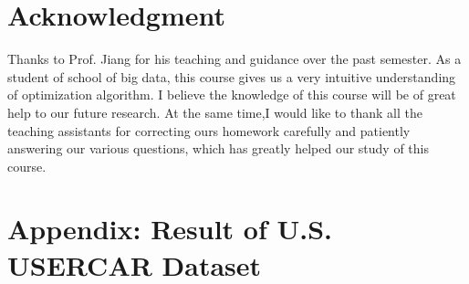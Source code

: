 \documentclass[11pt,en,authoryear]{elegantpaper}
\numberwithin{equation}{section}
\begin{document}
\section*{Acknowledgment}\label{acknowledgment}

Thanks to Prof. Jiang for his teaching and guidance over the past semester. As a student of school of big data, this course gives us a very intuitive understanding of optimization algorithm. I believe the knowledge of this course will be of great help to our future research. At the same time,I would like to thank all the teaching assistants for correcting ours homework carefully and patiently answering our various questions, which has greatly helped our study of this course.

\newpage

\section*{Appendix: Result of U.S. USERCAR Dataset}\label{appendix}
\end{document}
